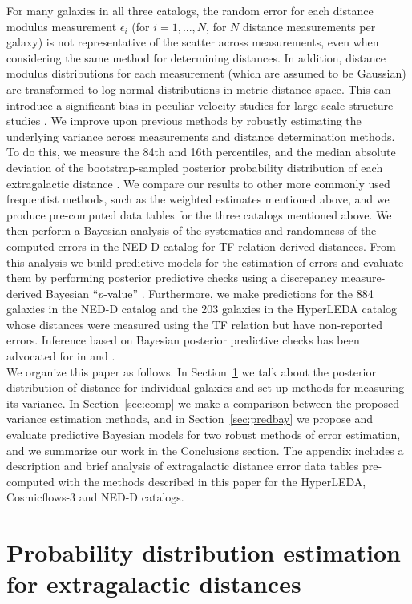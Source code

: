 \documentclass[a4paper,fleqn,usenatbib]{mnras}
\begin{document}
For many galaxies in all three catalogs, the random error for each distance modulus measurement $\epsilon_i$ (for $i=1,...,N$, for $N$ distance measurements per galaxy) is not representative of the scatter across measurements, even when considering the same method for determining distances. In addition, distance modulus distributions for each measurement (which are assumed to be Gaussian) are transformed to log-normal distributions in metric distance space. This can introduce a significant bias in peculiar velocity studies for large-scale structure studies \citep{lognormal}. We improve upon previous methods by robustly estimating the underlying variance across measurements and distance determination methods. To do this, we measure the 84th and 16th percentiles, and the median absolute deviation of the bootstrap-sampled posterior probability distribution of each extragalactic distance \citep{chaparro18}. We compare our results to other more commonly used frequentist methods, such as the weighted estimates mentioned above, and we produce pre-computed data tables for the three catalogs mentioned above. We then perform a Bayesian analysis of the systematics and randomness of the computed errors in the NED-D catalog for TF relation derived distances. From this analysis we build predictive models for the estimation of errors and evaluate them by performing posterior predictive checks using a discrepancy measure-derived Bayesian ``$p$-value'' \citep{gelmanppd}. Furthermore, we make predictions for the 884 galaxies in the NED-D catalog and the 203 galaxies in the HyperLEDA catalog whose distances were measured using the TF relation but have non-reported errors. Inference based on Bayesian posterior predictive checks has been advocated for in \citet{gelman2003} and \citet{ppcinf}.\\

We organize this paper as follows. In Section~\ref{sec:post} we talk about the posterior distribution of distance for individual galaxies and set up methods for measuring its variance. In Section~\ref{sec:comp} we make a comparison between the proposed variance estimation methods, and in Section~\ref{sec:predbay} we propose and evaluate predictive Bayesian models for two robust methods of error estimation, and we summarize our work in the Conclusions section. The appendix includes a description and brief analysis of extragalactic distance error data tables pre-computed with the methods described in this paper for the HyperLEDA, Cosmicflows-3 and NED-D catalogs.

\section{Probability distribution estimation for extragalactic distances}
\label{sec:post} 
 
\end{document}
